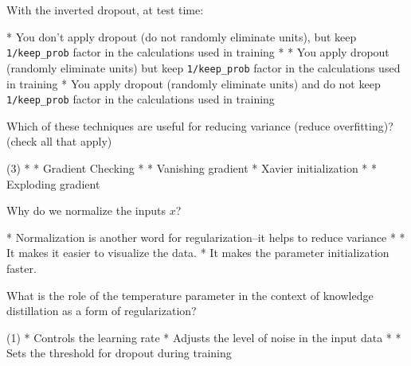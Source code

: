 \documentclass[11pt]{extarticle}
\begin{document}
\begin{exercise}
    With the inverted dropout, at test time:
    \begin{choice}
        * You don't apply dropout (do not randomly eliminate units), but keep \texttt{1/keep\_prob} factor in the calculations used in training
        * 
        * You apply dropout (randomly eliminate units) but keep \texttt{1/keep\_prob} factor in the calculations used in training
        * You apply dropout (randomly eliminate units) and do not keep \texttt{1/keep\_prob} factor in the calculations used in training
    \end{choice}
\end{exercise}
\begin{solution}
\end{solution}

\begin{exercise}
    Which of these techniques are useful for reducing variance (reduce overfitting)? (check all that apply)
    \begin{choice} (3)
        * 
        * Gradient Checking
        * 
        * Vanishing gradient
        * Xavier initialization
        * 
        * Exploding gradient
    \end{choice}
\end{exercise}
\begin{solution}
\end{solution}

\begin{exercise}
    Why do we normalize the inputs \(x\)?
    \begin{choice}
        * Normalization is another word for regularization--it helps to reduce variance
        * 
        * It makes it easier to visualize the data.
        * It makes the parameter initialization faster.
    \end{choice}
\end{exercise}
\begin{solution}
\end{solution}


\begin{exercise}
    What is the role of the temperature parameter in the context of knowledge distillation as a form of regularization?
    \begin{choice} (1)
        * Controls the learning rate
        * Adjusts the level of noise in the input data
        * 
        * Sets the threshold for dropout during training
    \end{choice}
\end{exercise}
\begin{solution}
\end{solution}
\end{document}
